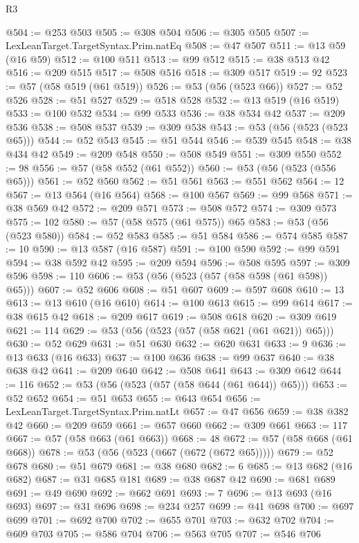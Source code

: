 \begin{lexlean}{R3}
\begin{coremodule}
@504 := @253 @503
@505 := @308 @504
@506 := @305 @505
@507 := LexLeanTarget.TargetSyntax.Prim.natEq
@508 := @47 @507
@511 := @13 @59 (@16 @59)
@512 := @100 @511
@513 := @99 @512
@515 := @38 @513 @42
@516 := @209 @515
@517 := @508 @516
@518 := @309 @517
@519 := 92
@523 := @57 (@58 @519 (@61 @519))
@526 := @53 (@56 (@523 @66))
@527 := @52 @526
@528 := @51 @527
@529 := @518 @528
@532 := @13 @519 (@16 @519)
@533 := @100 @532
@534 := @99 @533
@536 := @38 @534 @42
@537 := @209 @536
@538 := @508 @537
@539 := @309 @538
@543 := @53 (@56 (@523 (@523 @65)))
@544 := @52 @543
@545 := @51 @544
@546 := @539 @545
@548 := @38 @434 @42
@549 := @209 @548
@550 := @508 @549
@551 := @309 @550
@552 := 98
@556 := @57 (@58 @552 (@61 @552))
@560 := @53 (@56 (@523 (@556 @65)))
@561 := @52 @560
@562 := @51 @561
@563 := @551 @562
@564 := 12
@567 := @13 @564 (@16 @564)
@568 := @100 @567
@569 := @99 @568
@571 := @38 @569 @42
@572 := @209 @571
@573 := @508 @572
@574 := @309 @573
@575 := 102
@580 := @57 (@58 @575 (@61 @575)) @65
@583 := @53 (@56 (@523 @580))
@584 := @52 @583
@585 := @51 @584
@586 := @574 @585
@587 := 10
@590 := @13 @587 (@16 @587)
@591 := @100 @590
@592 := @99 @591
@594 := @38 @592 @42
@595 := @209 @594
@596 := @508 @595
@597 := @309 @596
@598 := 110
@606 := @53 (@56 (@523 (@57 (@58 @598 (@61 @598)) @65)))
@607 := @52 @606
@608 := @51 @607
@609 := @597 @608
@610 := 13
@613 := @13 @610 (@16 @610)
@614 := @100 @613
@615 := @99 @614
@617 := @38 @615 @42
@618 := @209 @617
@619 := @508 @618
@620 := @309 @619
@621 := 114
@629 := @53 (@56 (@523 (@57 (@58 @621 (@61 @621)) @65)))
@630 := @52 @629
@631 := @51 @630
@632 := @620 @631
@633 := 9
@636 := @13 @633 (@16 @633)
@637 := @100 @636
@638 := @99 @637
@640 := @38 @638 @42
@641 := @209 @640
@642 := @508 @641
@643 := @309 @642
@644 := 116
@652 := @53 (@56 (@523 (@57 (@58 @644 (@61 @644)) @65)))
@653 := @52 @652
@654 := @51 @653
@655 := @643 @654
@656 := LexLeanTarget.TargetSyntax.Prim.natLt
@657 := @47 @656
@659 := @38 @382 @42
@660 := @209 @659
@661 := @657 @660
@662 := @309 @661
@663 := 117
@667 := @57 (@58 @663 (@61 @663))
@668 := 48
@672 := @57 (@58 @668 (@61 @668))
@678 := @53 (@56 (@523 (@667 (@672 (@672 @65)))))
@679 := @52 @678
@680 := @51 @679
@681 := @38 @680
@682 := 6
@685 := @13 @682 (@16 @682)
@687 := @31 @685 @181
@689 := @38 @687 @42
@690 := @681 @689
@691 := @49 @690
@692 := @662 @691
@693 := 7
@696 := @13 @693 (@16 @693)
@697 := @31 @696
@698 := @234 @257
@699 := @41 @698
@700 := @697 @699
@701 := @692 @700
@702 := @655 @701
@703 := @632 @702
@704 := @609 @703
@705 := @586 @704
@706 := @563 @705
@707 := @546 @706

\end{coremodule}
\end{lexlean}
